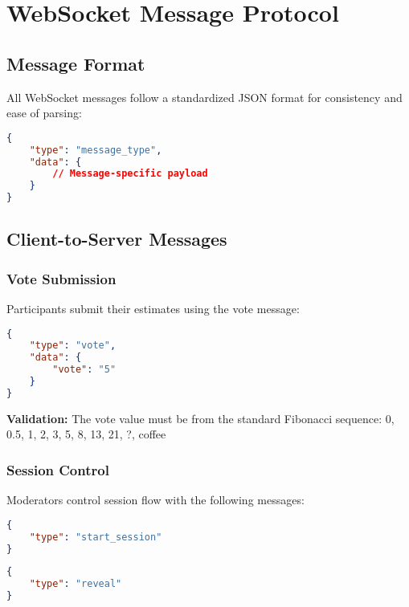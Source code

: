 \documentclass[11pt,a4paper]{article}
\begin{document}
\section{WebSocket Message Protocol}

\subsection{Message Format}

All WebSocket messages follow a standardized JSON format \cite{rfc7159} for consistency and ease of parsing:

\begin{lstlisting}[language=json, caption=Base Message Format]
{
    "type": "message_type",
    "data": {
        // Message-specific payload
    }
}
\end{lstlisting}

\subsection{Client-to-Server Messages}

\subsubsection{Vote Submission}

Participants submit their estimates using the vote message:

\begin{lstlisting}[language=json, caption=Vote Message]
{
    "type": "vote",
    "data": {
        "vote": "5"
    }
}
\end{lstlisting}

\textbf{Validation:} The vote value must be from the standard Fibonacci sequence: 0, 0.5, 1, 2, 3, 5, 8, 13, 21, ?, coffee

\subsubsection{Session Control}

Moderators control session flow with the following messages:

\begin{lstlisting}[language=json, caption=Start Session Message]
{
    "type": "start_session"
}
\end{lstlisting}

\begin{lstlisting}[language=json, caption=Reveal Votes Message]
{
    "type": "reveal"
}
\end{lstlisting}
\end{document}
